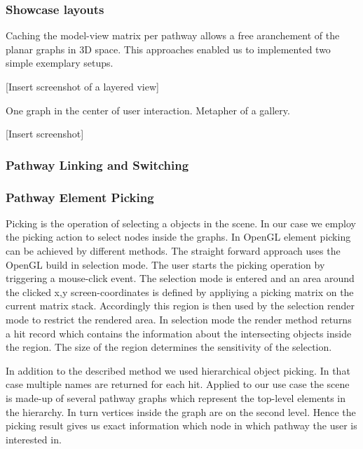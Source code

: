 \subsubsection{Showcase layouts}

Caching the model-view matrix per pathway allows a free aranchement of the planar graphs in 3D space.
This approaches enabled us to implemented two simple exemplary setups.


[Insert screenshot of a layered view]


One graph in the center of user interaction. Metapher of a gallery.

[Insert screenshot]


\subsubsection{Pathway Linking and Switching}


\subsubsection{Pathway Element Picking}

Picking is the operation of selecting a objects in the scene. In our case we employ the picking action to select nodes inside the graphs. In OpenGL element picking can be achieved by different methods. The straight forward approach uses the OpenGL build in selection mode\citep{Shreiner2005}. The user starts the picking operation by triggering a mouse-click event. The selection mode is entered and an area around the clicked x,y screen-coordinates is defined by appliying a picking matrix on the current matrix stack. Accordingly this region is then used by the selection render mode to restrict the rendered area. In selection mode the render method returns a hit record which contains the information about the intersecting objects inside the region. The size of the region determines the sensitivity of the selection.  

In addition to the described method we used hierarchical object picking. In that case multiple names are returned for each hit. Applied to our use case the scene is made-up of several pathway graphs which represent the top-level elements in the hierarchy. In turn vertices inside the graph are on the second level. Hence the picking result gives us exact information which node in which pathway the user is interested in.

